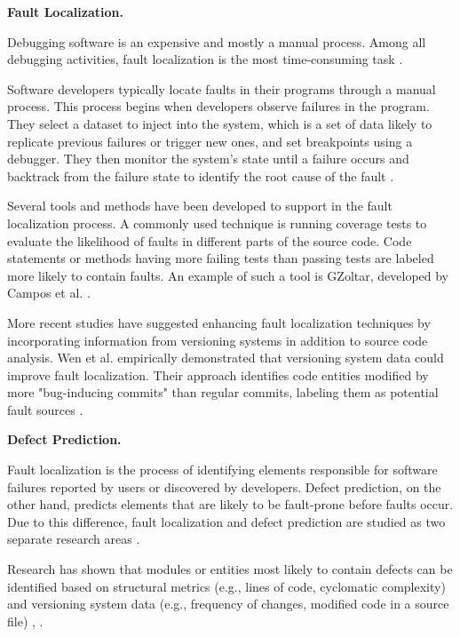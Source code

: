 \textbf{Fault Localization.}

Debugging software is an expensive and mostly a manual process. Among all debugging activities, fault localization is the most time-consuming task \cite{articleDebugging}. 

Software developers typically locate faults in their programs through a manual process. This process begins when developers observe failures in the program. They select a dataset to inject into the system, which is a set of data likely to replicate previous failures or trigger new ones, and set breakpoints using a debugger. They then monitor the system's state until a failure occurs and backtrack from the failure state to identify the root cause of the fault \cite{fault-localization, program-failures}. 

Several tools and methods have been developed to support in the fault localization process. A commonly used technique is running coverage tests to evaluate the likelihood of faults in different parts of the source code. Code statements or methods having more failing tests than passing tests are labeled more likely to contain faults. An example of such a tool is GZoltar, developed by Campos et al. \cite{fault-gz}. 

More recent studies have suggested enhancing fault localization techniques by incorporating information from versioning systems in addition to source code analysis. Wen et al. empirically demonstrated that versioning system data could improve fault localization. Their approach identifies code entities modified by more "bug-inducing commits" than regular commits, labeling them as potential fault sources \cite{fault-versioning}.


\textbf{Defect Prediction.}

Fault localization is the process of identifying elements responsible for software failures reported by users or discovered by developers. Defect prediction, on the other hand, predicts elements that are likely to be fault-prone before faults occur. Due to this difference, fault localization and defect prediction are studied as two separate research areas \cite{error-prone, fault-survey}.  

Research has shown that modules or entities most likely to contain defects can be identified based on structural metrics (e.g., lines of code, cyclomatic complexity) and versioning system data (e.g., frequency of changes, modified code in a source file) \cite{67595}, \cite{1702015}.
